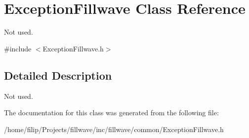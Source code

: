 \hypertarget{classExceptionFillwave}{}\section{Exception\+Fillwave Class Reference}
\label{classExceptionFillwave}


Not used.  




{\ttfamily \#include $<$Exception\+Fillwave.\+h$>$}



\subsection{Detailed Description}
Not used. 

The documentation for this class was generated from the following file\+:\begin{DoxyCompactItemize}
\item 
/home/filip/\+Projects/fillwave/inc/fillwave/common/Exception\+Fillwave.\+h\end{DoxyCompactItemize}
